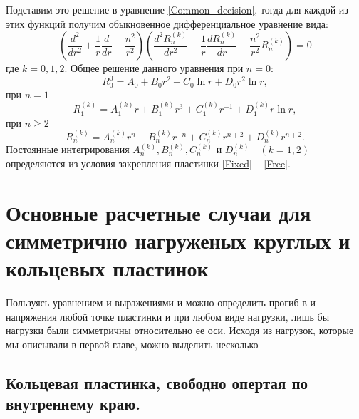 Подставим это решение в уравнение \eqref{Common_decision}, тогда для каждой из этих функций получим обыкновенное дифференциальное уравнение вида:
\begin{equation}
  \label{Clebsch}
  \left (\frac{d^2}{d r^2}+\frac{1}{r} \frac{d}{d r}-\frac{n^2}{r^2} \right ) \left (\frac{d ^2 R_{n}^{(k)}}{d r^2}+\frac{1}{r} \frac{d R_{n}^{(k)}}{d r}-\frac{n^2}{r^2} R_{n}^{(k)} \right )=0
\end{equation}
где $k=0,1,2$. Общее решение данного уравнения при $n=0$:
\begin{equation}
  \label{R_0}
  R_0^0=A_0+B_{0}r^2+C_{0} \ln{r}+D_{0}r^2 \ln{r},
\end{equation}
при $n=1$
\begin{equation}
  \label{R_1^k}
  R_1^{(k)}=A_1^{(k)}r+B_1^{(k)}r^3+C_1^{(k)} r^{-1}+D_1^{(k)}r \ln{r},
\end{equation}
при $n \geq 2$
\begin{equation}
  \label{R_n^k}
  R_n^{(k)}=A_n^{(k)}r^{n}+B_n^{(k)}r^{-n}+C_n^{(k)} r^{n+2}+D_n^{(k)} r^{n+2}.
\end{equation}
Постоянные интегрирования $A_n^{(k)}, B_n^{(k)}, C_n^{(k)}$ и $D_n^{(k)} \quad (k=1,2)$ определяются из условия закрепления пластинки \eqref{Fixed} -- \eqref{Free}.

\section{Основные расчетные случаи для симметрично нагруженых круглых и кольцевых пластинок}

Пользуясь уравнением и выражениями и можно определить прогиб в и напряжения любой точке пластинки и при любом виде нагрузки, лишь бы нагрузки были симметричны относительно ее оси.
Исходя из нагрузок, которые мы описывали в первой главе, можно выделить несколько  

\subsection{Кольцевая пластинка, свободно опертая по внутреннему краю.}
\label{RingPlateForce}

